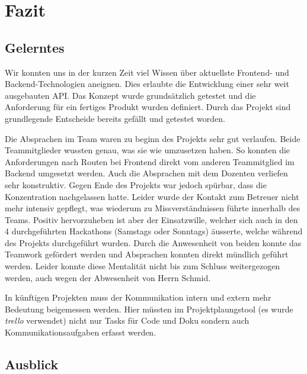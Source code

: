 \chapter{Fazit}
\label{chap:fazit}

\section{Gelerntes}
Wir konnten uns in der kurzen Zeit viel Wissen über aktuellste Frontend- und Backend-Technologien aneignen. Dies erlaubte die Entwicklung einer sehr weit ausgebauten API. Das Konzept wurde grundsätzlich getestet und die Anforderung für ein fertiges Produkt wurden definiert. Durch das Projekt sind grundlegende Entscheide bereits gefällt und getestet worden. 

Die Absprachen im Team waren zu beginn des Projekts sehr gut verlaufen. Beide Teammitglieder wussten genau, was sie wie umzusetzen haben. So konnten die Anforderungen nach Routen bei Frontend direkt vom anderen Teammitglied im Backend umgesetzt werden. Auch die Absprachen mit dem Dozenten verliefen sehr konstruktiv. Gegen Ende des Projekts war jedoch spürbar, dass die Konzentration nachgelassen hatte. Leider wurde der Kontakt zum Betreuer nicht mehr intensiv gepflegt, was wiederum zu Missverständnissen führte innerhalb des Teams. Positiv hervorzuheben ist aber der Einsatzwille, welcher sich auch in den 4 durchgeführten Hackathons (Samstags oder Sonntags) äusserte, welche während des Projekts durchgeführt wurden. Durch die Anwesenheit von beiden konnte das Teamwork gefördert werden und Absprachen konnten direkt mündlich geführt werden. Leider konnte diese Mentalität nicht bis zum Schluss weitergezogen werden, auch wegen der Abwesenheit von Herrn Schmid.

In künftigen Projekten muss der Kommunikation intern und extern mehr Bedeutung beigemessen werden. Hier müssten im Projektplaungstool (es wurde \emph{trello} verwendet) nicht nur Tasks für Code und Doku sondern auch Kommunikationsaufgaben erfasst werden.

\section{Ausblick}
